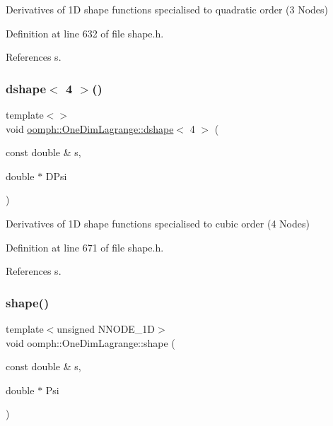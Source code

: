 Derivatives of 1D shape functions specialised to quadratic order (3 Nodes) 



Definition at line 632 of file shape.\+h.



References s.

\mbox{\label{namespaceoomph_1_1OneDimLagrange_aae4d85c677e27103cc7163b298cd4cba}} 
\subsubsection{\texorpdfstring{dshape$<$ 4 $>$()}{dshape< 4 >()}}
{\footnotesize\ttfamily template$<$$>$ \\
void \hyperlink{namespaceoomph_1_1OneDimLagrange_af66e48b956c460371ac77032c1efcd72}{oomph\+::\+One\+Dim\+Lagrange\+::dshape}$<$ 4 $>$ (\begin{DoxyParamCaption}\item[{const double \&}]{s,  }\item[{double $\ast$}]{D\+Psi }\end{DoxyParamCaption})\hspace{0.3cm}{\ttfamily [inline]}}



Derivatives of 1D shape functions specialised to cubic order (4 Nodes) 



Definition at line 671 of file shape.\+h.



References s.

\mbox{\label{namespaceoomph_1_1OneDimLagrange_a117f8b892dc89989ecdad99ff261e120}} 
\subsubsection{\texorpdfstring{shape()}{shape()}}
{\footnotesize\ttfamily template$<$unsigned N\+N\+O\+D\+E\+\_\+1D$>$ \\
void oomph\+::\+One\+Dim\+Lagrange\+::shape (\begin{DoxyParamCaption}\item[{const double \&}]{s,  }\item[{double $\ast$}]{Psi }\end{DoxyParamCaption})}



